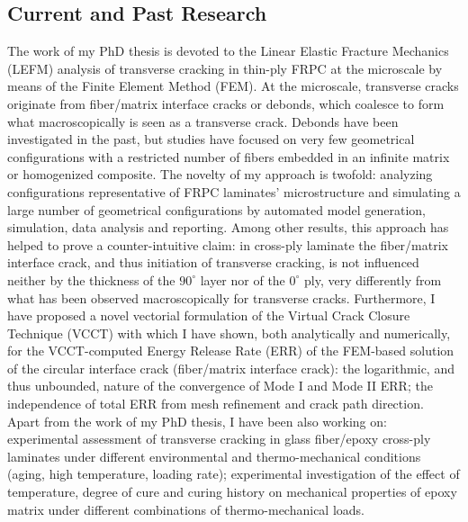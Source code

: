 \documentclass[
  a4paper, 
]{fortysecondscv}
\begin{document}
\subsection{Current and Past Research}
The work of my PhD thesis is devoted to the Linear Elastic Fracture Mechanics (LEFM) analysis of transverse cracking in thin-ply FRPC at the microscale by means of the Finite Element Method (FEM). At the microscale, transverse cracks originate from fiber/matrix interface cracks or debonds, which coalesce to form what macroscopically is seen as a transverse crack. Debonds have been investigated in the past, but studies have focused on very few geometrical configurations with a restricted number of fibers embedded in an infinite matrix or homogenized composite. The novelty of my approach is twofold: analyzing configurations representative of FRPC laminates' microstructure and simulating a large number of geometrical configurations by automated model generation, simulation, data analysis and reporting. Among other results, this approach has helped to prove a counter-intuitive claim: in cross-ply laminate the fiber/matrix interface crack, and thus initiation of transverse cracking, is not influenced neither by the thickness of the $90^{\circ}$ layer nor of the $0^{\circ}$ ply, very differently from what has been observed macroscopically for transverse cracks. Furthermore, I have proposed a novel vectorial formulation of the Virtual Crack Closure Technique (VCCT) with which I have shown, both analytically and numerically, for the VCCT-computed Energy Release Rate (ERR) of the FEM-based solution of the circular interface crack (fiber/matrix interface crack): the logarithmic, and thus unbounded, nature of the convergence of Mode I and Mode II ERR; the independence of total ERR from mesh refinement and crack path direction.\\
Apart from the work of my PhD thesis, I have been also working on: experimental assessment of transverse cracking in glass fiber/epoxy cross-ply laminates under different environmental and thermo-mechanical conditions (aging, high temperature, loading rate); experimental investigation of the effect of temperature, degree of cure and curing history on mechanical properties of epoxy matrix under different combinations of thermo-mechanical loads.
\end{document}
